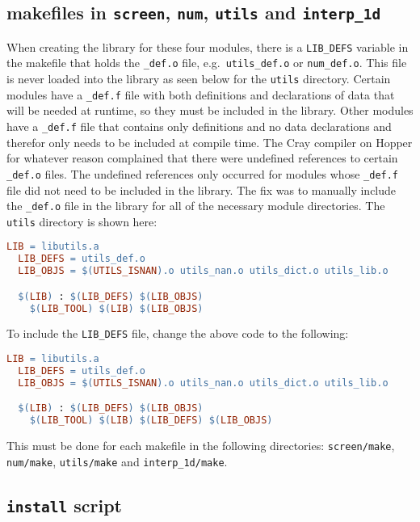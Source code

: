 \subsection{makefiles in {\tt screen}, {\tt num}, {\tt utils} and 
{\tt interp\_1d}}

When creating the library for these four modules, there is a {\tt LIB\_DEFS} 
variable in the makefile that holds the {\tt *\_def.o} file, e.g.\ 
{\tt utils\_def.o} or {\tt num\_def.o}. This file is never loaded into the 
library as seen below for the {\tt utils} directory. Certain modules have a 
{\tt *\_def.f} file with both definitions and declarations of data that will 
be needed at runtime, so they must be included in the library. Other modules 
have a {\tt *\_def.f} file that contains only definitions and no data 
declarations and therefor only needs to be included at compile time. The Cray 
compiler on Hopper for whatever reason complained that there were undefined 
references to certain {\tt *\_def.o} files. The undefined references only 
occurred for modules whose {\tt *\_def.f} file did not need to be included in 
the library. The fix was to manually include the {\tt *\_def.o} file in the 
library for all of the necessary module directories. The {\tt utils} directory 
is shown here:
\begin{lstlisting}[language=make,mathescape=false]
  LIB = libutils.a
  LIB_DEFS = utils_def.o
  LIB_OBJS = $(UTILS_ISNAN).o utils_nan.o utils_dict.o utils_lib.o

  $(LIB) : $(LIB_DEFS) $(LIB_OBJS)
  	$(LIB_TOOL) $(LIB) $(LIB_OBJS)
\end{lstlisting}
To include the {\tt LIB\_DEFS} file, change the above code to the following:
\begin{lstlisting}[language=make,mathescape=false]
  LIB = libutils.a
  LIB_DEFS = utils_def.o
  LIB_OBJS = $(UTILS_ISNAN).o utils_nan.o utils_dict.o utils_lib.o

  $(LIB) : $(LIB_DEFS) $(LIB_OBJS)
  	$(LIB_TOOL) $(LIB) $(LIB_DEFS) $(LIB_OBJS)
\end{lstlisting}
This must be done for each makefile in the following directories: 
{\tt screen/make}, {\tt num/make}, {\tt utils/make} and {\tt interp\_1d/make}.

\subsection{{\tt install} script}

